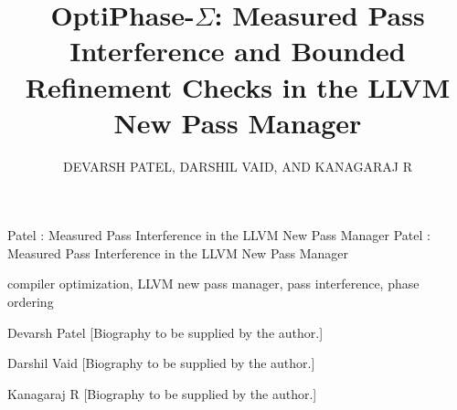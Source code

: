 \documentclass{ieeeaccess}
\newcounter{biography}
\begin{document}

\title{OptiPhase-$\Sigma$: Measured Pass Interference and Bounded Refinement Checks in the LLVM New Pass Manager}
\author{\uppercase{Devarsh Patel, Darshil Vaid, and Kanagaraj R}}
\address[1]{School of Computer Science and Engineering, Vellore Institute of Technology, Vellore, India (e-mail: devarsh.patel2024@vitstudent.ac.in)}
\address[2]{School of Computer Science and Engineering, Vellore Institute of Technology, Vellore, India (e-mail: darshil.vaid2024@vitstudent.ac.in)}
\address[3]{School of Computer Science and Engineering, Vellore Institute of Technology, Vellore, India (e-mail: kanagaraj.r@vit.ac.in)}

\markboth
{Patel \headeretal: Measured Pass Interference in the LLVM New Pass Manager}
{Patel \headeretal: Measured Pass Interference in the LLVM New Pass Manager}


\begin{abstract}

\end{abstract}

\begin{keywords}
compiler optimization, LLVM new pass manager, pass interference, phase ordering
\end{keywords}

\titlepgskip=-15pt

\maketitle












\begin{IEEEbiographynophoto}{Devarsh Patel}
[Biography to be supplied by the author.]
\end{IEEEbiographynophoto}

\begin{IEEEbiographynophoto}{Darshil Vaid}
[Biography to be supplied by the author.]
\end{IEEEbiographynophoto}

\begin{IEEEbiographynophoto}{Kanagaraj R}
[Biography to be supplied by the author.]
\end{IEEEbiographynophoto}

\EOD
\end{document}
